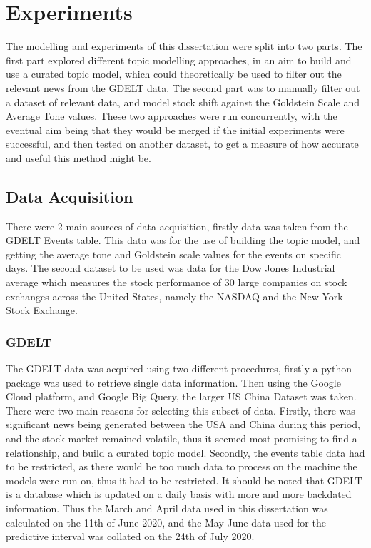 \section{Experiments}

The modelling and experiments of this dissertation were split into two parts. The first part explored different topic modelling approaches, in an aim to build and use a curated topic model, which could theoretically be used to filter out the relevant news from the GDELT data. The second part was to manually filter out a dataset of relevant data, and model stock shift against the Goldstein Scale and Average Tone values. These two approaches were run concurrently, with the eventual aim being that they would be merged if the initial experiments were successful, and then tested on another dataset, to get a measure of how accurate and useful this method might be. 

\subsection{Data Acquisition}
There were 2 main sources of data acquisition, firstly data was taken from the GDELT Events table. This data was for the use of building the topic model, and getting the average tone and Goldstein scale values for the events on specific days. The second dataset to be used was data for the Dow Jones Industrial average which measures the stock performance of 30 large companies on stock exchanges across the United States, namely the NASDAQ and the New York Stock Exchange.

\subsubsection{GDELT}
The GDELT data was acquired using two different procedures, firstly a python package was used to retrieve single data information. Then using the Google Cloud platform, and Google Big Query, the larger US China Dataset was taken. There were two main reasons for selecting this subset of data. Firstly, there was significant news being generated between the USA and China during this period, and the stock market remained volatile, thus it seemed most promising to find a relationship, and build a curated topic model. Secondly, the events table data had to be restricted, as there would be too much data to process on the machine the models were run on, thus it had to be restricted. It should be noted that GDELT is a database which is updated on a daily basis with more and more backdated information. Thus the March and April data used in this dissertation was calculated on the 11th of June 2020, and the May June data used for the predictive interval was collated on the 24th of July 2020. 

